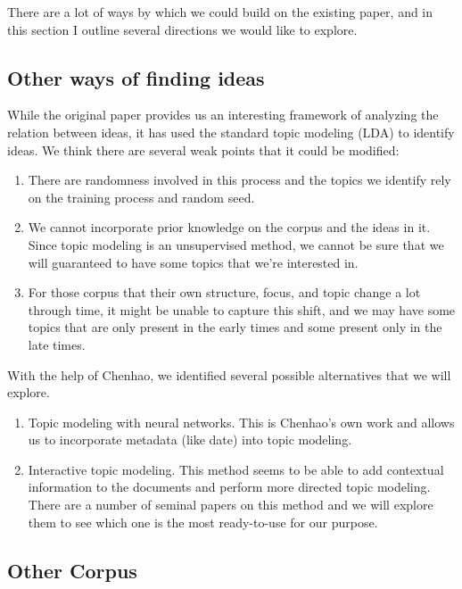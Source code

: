 \documentclass{article}
\begin{document}
There are a lot of ways by which we could build on the existing paper, and in this section I outline several directions we would like to explore.

\subsection{Other ways of finding ideas}

While the original paper provides us an interesting framework of analyzing the relation between ideas, it has used the standard topic modeling (LDA) to identify ideas. We think there are several weak points that it could be modified:

\begin{enumerate}
  \item There are randomness involved in this process and the topics we identify rely on the training process and random seed.
  \item We cannot incorporate prior knowledge on the corpus and the ideas in it. Since topic modeling is an unsupervised method, we cannot be sure that we will guaranteed to have some topics that we're interested in. 
  \item For those corpus that their own structure, focus, and topic change a lot through time, it might be unable to capture this shift, and we may have some topics that are only present in the early times and some present only in the late times.
\end{enumerate}

With the help of Chenhao, we identified several possible alternatives that we will explore.

\begin{enumerate}
  \item Topic modeling with neural networks. This is Chenhao's own work and allows us to incorporate metadata (like date) into topic modeling. \cite{chenhao}
  \item Interactive topic modeling. \cite{interactive} This method seems to be able to add contextual information to the documents and perform more directed topic modeling. There are a number of seminal papers on this method and we will explore them to see which one is the most ready-to-use for our purpose. \cite{interactivec} \cite{interactiveb}
\end{enumerate}  



\subsection{Other Corpus}
\end{document}
